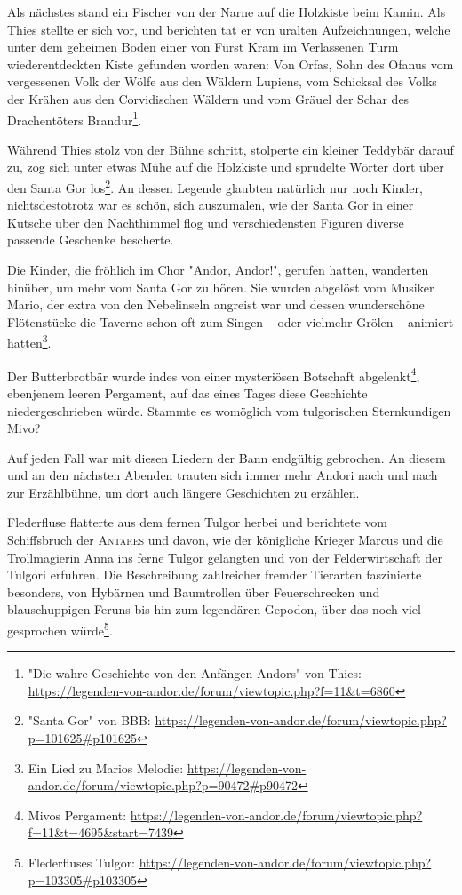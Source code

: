 Als nächstes stand ein Fischer von der Narne auf die Holzkiste beim Kamin. Als Thies stellte er sich vor, und berichten tat er von uralten Aufzeichnungen, welche unter dem geheimen Boden einer von Fürst Kram im Verlassenen Turm wiederentdeckten Kiste gefunden worden waren: Von Orfas, Sohn des Ofanus vom vergessenen Volk der Wölfe aus den Wäldern Lupiens, vom Schicksal des Volks der Krähen aus den Corvidischen Wäldern und vom Gräuel der Schar des Drachentöters Brandur\footnote{"Die wahre Geschichte von den Anfängen Andors" von Thies: \url{https://legenden-von-andor.de/forum/viewtopic.php?f=11&t=6860}}.

Während Thies stolz von der Bühne schritt, stolperte ein kleiner Teddybär darauf zu, zog sich unter etwas Mühe auf die Holzkiste und sprudelte Wörter dort über den Santa Gor los\footnote{"Santa Gor" von BBB: \url{https://legenden-von-andor.de/forum/viewtopic.php?p=101625\#p101625}}. An dessen Legende glaubten natürlich nur noch Kinder, nichtsdestotrotz war es schön, sich auszumalen, wie der Santa Gor in einer Kutsche über den Nachthimmel flog und verschiedensten Figuren diverse passende Geschenke bescherte.

Die Kinder, die fröhlich im Chor "Andor, Andor!", gerufen hatten, wanderten hinüber, um mehr vom Santa Gor zu hören. Sie wurden abgelöst vom Musiker Mario, der extra von den Nebelinseln angreist war und dessen wunderschöne Flötenstücke die Taverne schon oft zum Singen -- oder vielmehr Grölen -- animiert hatten\footnote{Ein Lied zu Marios Melodie: \url{https://legenden-von-andor.de/forum/viewtopic.php?p=90472\#p90472}}.

Der Butterbrotbär wurde indes von einer mysteriösen Botschaft abgelenkt\footnote{Mivos Pergament: \url{https://legenden-von-andor.de/forum/viewtopic.php?f=11&t=4695&start=7439}}, ebenjenem leeren Pergament, auf das eines Tages diese Geschichte niedergeschrieben würde. Stammte es womöglich vom tulgorischen Sternkundigen Mivo?

Auf jeden Fall war mit diesen Liedern der Bann endgültig gebrochen. An diesem und an den nächsten Abenden trauten sich immer mehr Andori nach und nach zur Erzählbühne, um dort auch längere Geschichten zu erzählen.

Flederfluse flatterte aus dem fernen Tulgor herbei und berichtete vom Schiffsbruch der \textsc{Antares} und davon, wie der königliche Krieger Marcus und die Trollmagierin Anna ins ferne Tulgor gelangten und von der Felderwirtschaft der Tulgori erfuhren. Die Beschreibung zahlreicher fremder Tierarten faszinierte besonders, von Hybärnen und Baumtrollen über Feuerschrecken und blauschuppigen Feruns bis hin zum legendären Gepodon, über das noch viel gesprochen würde\footnote{Flederfluses Tulgor: \url{https://legenden-von-andor.de/forum/viewtopic.php?p=103305\#p103305}}. 

